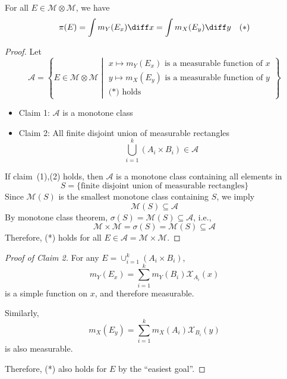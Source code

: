 \begin{proposition}
For all $E\in\mathcal{M}\otimes\mathcal{M}$, we have
\[
\pi(E) = \int m_Y(E_x)\diff x
=
\int m_X(E_y)\diff y\quad(*)
\]
\end{proposition}
\begin{proof}
Let 
\[
\mathcal{A} = \left\{E\in\mathcal{M}\otimes\mathcal{M}
\middle|
\begin{array}{l}
x\mapsto m_Y(E_x)\text{ is a measurable function of $x$}\\
y\mapsto m_X(E_y)\text{ is a measurable function of $y$}\\
\text{(*) holds}
\end{array}
\right\}
\]
\begin{itemize}
\item
Claim 1: $\mathcal{A}$ is a monotone class
\item
Claim 2: All finite disjoint union of measurable rectangles 
\[
\bigcup_{i=1}^k(A_i\times B_i)\in\mathcal{A}
\]
\end{itemize}
If claim~(1),(2) holds, then $\mathcal{A}$ is a monotone class containing all elements in 
\[
S=\{\text{finite disjoint union of measurable rectangles}\}
\]
Since $\mathcal{M}(S)$ is the smallest monotone class containing $S$, we imply
\[
\mathcal{M}(S)\subseteq\mathcal{A}
\]
By monotone class theorem, $\sigma(S)=\mathcal{M}(S)\subseteq\mathcal{A}$, i.e.,
\[
\mathcal{M}\times\mathcal{M} = \sigma(S)=\mathcal{M}(S)\subseteq\mathcal{A}
\]
Therefore, (*) holds for all $E\in\mathcal{A}=\mathcal{M}\times\mathcal{M}$.
\end{proof}
\begin{proof}[Proof of Claim 2]
For any $E=\cup_{i=1}^k(A_i\times B_i)$, 
\[
m_Y(E_x)=\sum_{i=1}^k m_Y(B_i)\mathcal{X}_{A_i}(x)
\]
is a simple function on $x$, and therefore measurable.

Similarly, 
\[
m_X(E_y) = \sum_{i=1}^km_X(A_i)\mathcal{X}_{B_i}(y)
\]
is also measurable.

Therefore, (*) also holds for $E$ by the ``easiest goal''.
\end{proof}




















